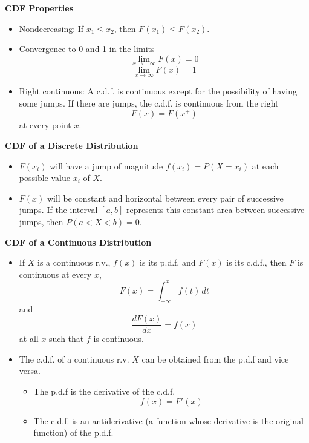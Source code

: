 \documentclass[11pt]{article}
\begin{document}
\textbf{CDF Properties}
\begin{itemize}
    \item Nondecreasing: If $x_1 \le x_2$, then $F(x_1) \le F(x_2)$.
    \item Convergence to 0 and 1 in the limits
    \[ \lim_{x \to -\infty} F(x)=0 \]
    \[ \lim_{x \to \infty} F(x)=1 \]
    \item Right continuous: A c.d.f. is continuous except for the possibility of having some 
    jumps. If there are jumps, the c.d.f. is continuous from the right
    \[F(x) = F(x^+)\] at every point $x$.
\end{itemize}

\textbf{CDF of a Discrete Distribution}
\begin{itemize}
    \item $F(x_i)$ will have a jump of magnitude $f(x_i) = P(X = x_i)$ at each possible value $x_i$ of $X$.
    \item $F(x)$ will be constant and horizontal between every pair of successive jumps. If the 
    interval $[a,b]$ represents this constant area between successive jumps, then $P(a < X < b)
    = 0$.
\end{itemize}

\textbf{CDF of a Continuous Distribution}
\begin{itemize}
    \item If $X$ is a continuous r.v., $f(x)$ is its p.d.f, and $F(x)$ is its c.d.f., then $F$
    is continuous at every $x$,
    \[F(x) = \int_{-\infty}^{x} f(t) \,dt\] and \[\frac{dF(x)}{dx} = f(x)\] 
    at all $x$ such that $f$ is continuous.
    \item The c.d.f. of a continuous r.v. $X$ can be obtained from the p.d.f and vice versa.
    \begin{itemize}
        \item The p.d.f is the derivative of the c.d.f.
        \[f(x) = F'(x)\]
        \item The c.d.f. is an antiderivative (a function whose derivative is the original 
        function) of the p.d.f.
    \end{itemize}
\end{itemize}
\end{document}
